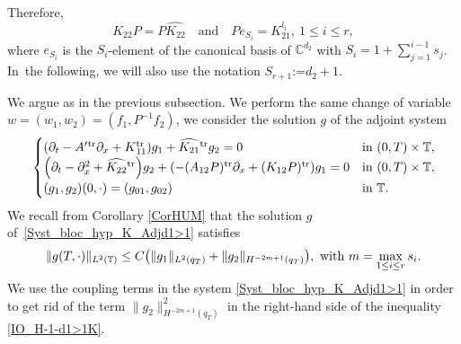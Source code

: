 \documentclass[JEP,XML,SOM,Unicode,NoEqCountersInSection]{cedram}
\theoremstyle{plain}
\theoremstyle{definition}
\theoremstyle{remark}
\newcommand{\set}{\mathbb}
\renewcommand{\C}{\set{C}}
\newcommand{\T}{\set{T}}
\newcommand{\Tr}[1]{{#1}{}^{\mathrm{tr}}}
\newcommand{\coloneqq}{\mathrel{\mathord{:}\mathord=}}
\let\originalleft\left
\let\originalright\right
\renewcommand{\left}{\mathopen{}\mathclose\bgroup\originalleft}
\renewcommand{\right}{\aftergroup\egroup\originalright}
\begin{document}
Therefore,
\begin{equation}
K_{22} P = P\widehat{K_{22}}\quad \text{and}\quad P e_{S_i} = K_{21}^{l_i},\ 1 \leq i \leq r,
\label{RelationK22PK21}
\end{equation}
where $e_{S_i}$ is the $S_i$-element of the canonical basis of $\C^{d_2}$ with $S_i = 1 +
\sum_{j=1}^{i-1} s_j$. In~the following, we will also use the notation $S_{r+1}\coloneqq
d_2+1$.

We argue as in the previous subsection. We perform the same change of variable $w =(w_1,w_2) = (f_1,P^{-1}f_2)$, we consider the solution $g$ of the adjoint system \begin{equation} \label{Syst_bloc_hyp_K_Adjd1>1}
\begin{cases}
\left(\partial_t -\Tr{A'}\partial_x+\Tr K_{11}\right)g_1 +\Tr{\widehat{K_{21}}} g_2= 0
&\text{in}\ (0,T)\times \T,\!\\
\left(\partial_t - \partial_x^2+\Tr{\widehat{K_{22}}}\right)g_2 +\left(-\Tr{(A_{12}P)}\partial_x+\Tr{(K_{12}P)}\right)g_1 = 0 &\text{in}\ (0,T)\times \T,\!\\
(g_1,g_2)(0,\cdot)=(g_{01},g_{02}) & \text{in}\ \T.
\end{cases}
\end{equation}
We recall from Corollary \ref{CorHUM} that the solution $g$ of~\eqref{Syst_bloc_hyp_K_Adjd1>1} satisfies
\begin{equation} \label{IO_H-1-d1>1K}
\| g(T,\cdot) \|_{L^2(\T)} \leq C \left(\| g_1\|_{L^2(q_T)} + \|g_2\|_{H^{-2m+1}(q_T)} \right),\ \text{with}\ m=\max_{1 \leq i \leq r}s_i.
\end{equation}
We use the coupling terms in the system \eqref{Syst_bloc_hyp_K_Adjd1>1} in order to get rid of the term $\|g_2\|_{H^{-2m+1}(q_T)}^2$ in the right-hand side of the inequality \eqref{IO_H-1-d1>1K}.
\end{document}
